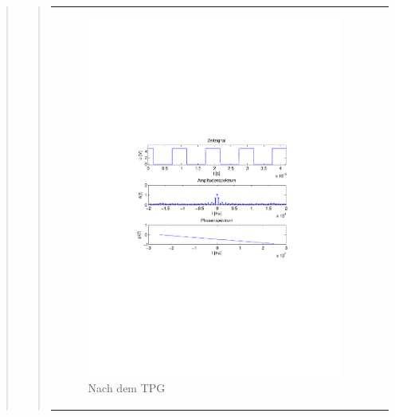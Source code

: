 \begin{quote}
\begin{quote}
         \begin{center}
            \begin{tabular}{ll}
            
            \hspace{-5cm}
                \begin{minipage}{0.67\textwidth}
                    \begin{figure}[H]
                        \label{fig:vor Filter}
                        \includegraphics[scale=0.7, trim = 35mm 100mm 35mm 95mm, clip]{Bilder/TwPuB}
                        \caption{Nach dem TPG}
                    \end{figure}
                \end{minipage}
                

\end{tabular}
\end{center}
\end{quote}
\end{quote}
